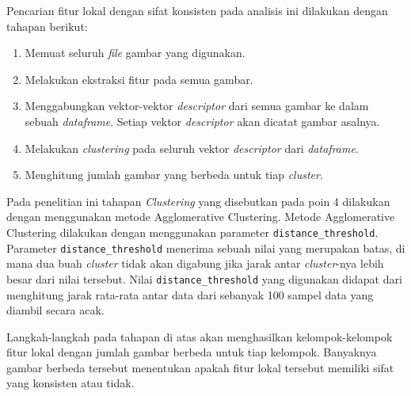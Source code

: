 Pencarian fitur lokal dengan sifat konsisten pada analisis ini dilakukan dengan tahapan berikut:
\begin{enumerate}
	\item Memuat seluruh \textit{file} gambar yang digunakan.
	\item Melakukan ekstraksi fitur pada semua gambar.
	\item Menggabungkan vektor-vektor \textit{descriptor} dari semua gambar ke dalam sebuah \textit{dataframe}. Setiap vektor \textit{descriptor} akan dicatat gambar asalnya.
	\item Melakukan \textit{clustering} pada seluruh vektor \textit{descriptor} dari \textit{dataframe}.
	\item Menghitung jumlah gambar yang berbeda untuk tiap \textit{cluster}.
\end{enumerate}
Pada penelitian ini tahapan \textit{Clustering} yang disebutkan pada poin 4 dilakukan dengan menggunakan metode Agglomerative Clustering. Metode Agglomerative Clustering dilakukan dengan menggunakan parameter \texttt{distance\_threshold}. Parameter \texttt{distance\_threshold} menerima sebuah nilai yang merupakan batas, di mana dua buah \textit{cluster} tidak akan digabung jika jarak antar \textit{cluster}-nya lebih besar dari nilai tersebut. Nilai \texttt{distance\_threshold} yang digunakan didapat dari menghitung jarak rata-rata antar data dari sebanyak 100 sampel data yang diambil secara acak.

Langkah-langkah pada tahapan di atas akan menghasilkan kelompok-kelompok fitur lokal dengan jumlah gambar berbeda untuk tiap kelompok. Banyaknya gambar berbeda tersebut menentukan apakah fitur lokal tersebut memiliki sifat yang konsisten atau tidak. 

